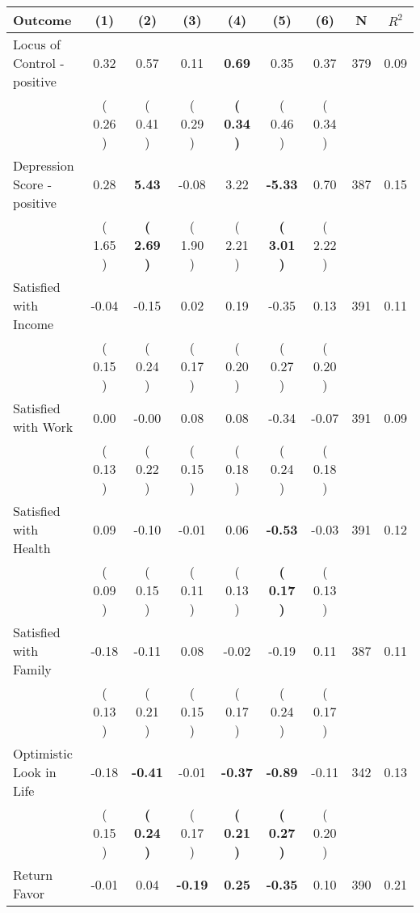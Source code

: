 \begin{tabular}{lcccccccc}
\toprule
 \textbf{Outcome} & \textbf{(1)} & \textbf{(2)} & \textbf{(3)} & \textbf{(4)} & \textbf{(5)} & \textbf{(6)} & \textbf{N} & \textbf{$ R^2$} \\
\midrule
Locus of Control - positive &      0.32 &      0.57 &      0.11 & \textbf{     0.69} &      0.35 &      0.37 & 379 &       0.09 \\ 
 & (     0.26 ) & (     0.41 ) & (     0.29 ) & \textbf{(     0.34 )} & (     0.46 ) & (     0.34 ) & \\
Depression Score - positive &      0.28 & \textbf{     5.43} &     -0.08 &      3.22 & \textbf{    -5.33} &      0.70 & 387 &       0.15 \\ 
 & (     1.65 ) & \textbf{(     2.69 )} & (     1.90 ) & (     2.21 ) & \textbf{(     3.01 )} & (     2.22 ) & \\
Satisfied with Income &     -0.04 &     -0.15 &      0.02 &      0.19 &     -0.35 &      0.13 & 391 &       0.11 \\ 
 & (     0.15 ) & (     0.24 ) & (     0.17 ) & (     0.20 ) & (     0.27 ) & (     0.20 ) & \\
Satisfied with Work &      0.00 &     -0.00 &      0.08 &      0.08 &     -0.34 &     -0.07 & 391 &       0.09 \\ 
 & (     0.13 ) & (     0.22 ) & (     0.15 ) & (     0.18 ) & (     0.24 ) & (     0.18 ) & \\
Satisfied with Health &      0.09 &     -0.10 &     -0.01 &      0.06 & \textbf{    -0.53} &     -0.03 & 391 &       0.12 \\ 
 & (     0.09 ) & (     0.15 ) & (     0.11 ) & (     0.13 ) & \textbf{(     0.17 )} & (     0.13 ) & \\
Satisfied with Family &     -0.18 &     -0.11 &      0.08 &     -0.02 &     -0.19 &      0.11 & 387 &       0.11 \\ 
 & (     0.13 ) & (     0.21 ) & (     0.15 ) & (     0.17 ) & (     0.24 ) & (     0.17 ) & \\
Optimistic Look in Life &     -0.18 & \textbf{    -0.41} &     -0.01 & \textbf{    -0.37} & \textbf{    -0.89} &     -0.11 & 342 &       0.13 \\ 
 & (     0.15 ) & \textbf{(     0.24 )} & (     0.17 ) & \textbf{(     0.21 )} & \textbf{(     0.27 )} & (     0.20 ) & \\
Return Favor &     -0.01 &      0.04 & \textbf{    -0.19} & \textbf{     0.25} & \textbf{    -0.35} &      0.10 & 390 &       0.21 \\ 

\end{tabular}
